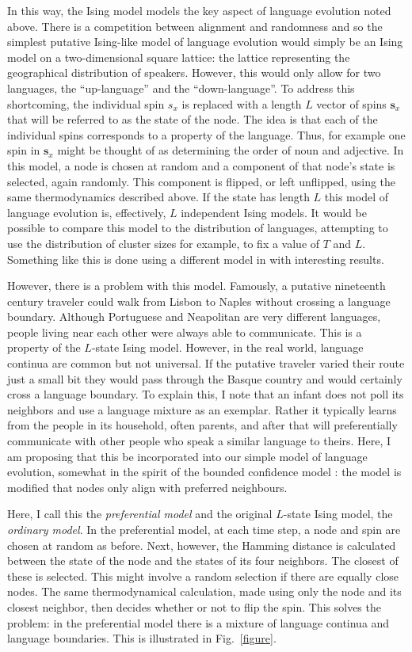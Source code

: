 \documentclass[letterpaper]{article}
\begin{document}
In this way, the Ising model models the key aspect of language evolution noted above. There is a competition between alignment and randomness and so the simplest putative Ising-like model of language evolution would simply be an Ising model on a two-dimensional square lattice: the lattice representing the geographical distribution of speakers. However, this would only allow for two languages, the ``up-language'' and the ``down-language''. To address this shortcoming, the individual spin $s_x$ is replaced with a length $L$ vector of spins $\textbf{s}_x$ that will be referred to as the state of the node. The idea is that each of the individual spins corresponds to a property of the language. Thus, for example one spin in $\textbf{s}_x$ might be thought of as determining the order of noun and adjective. In this model, a node is chosen at random and a component of that node's state is selected, again randomly. This component is flipped, or left unflipped, using the same thermodynamics described above. If the state has length $L$ this model of language evolution is, effectively, $L$ independent Ising models. It would be possible to compare this model to the distribution of languages, attempting to use the distribution of cluster sizes for example, to fix a value of $T$ and $L$. Something like this is done using a different model in \cite{SivaEtAl2015, SivaEtAl2017} with interesting results.

However, there is a problem with this model. Famously, a putative nineteenth century traveler could walk from Lisbon to Naples without crossing a language boundary. Although Portuguese and Neapolitan are very different languages, people living near each other were always able to communicate. This is a property of the $L$-state Ising model. However, in the real world, language continua are common but not universal. If the putative traveler varied their route just a small bit they would pass through the Basque country and would certainly cross a language boundary. To explain this, I note that an infant does not poll its neighbors and use a language mixture as an exemplar. Rather it typically learns from the people in its household, often parents, and after that will preferentially communicate with other people who speak a similar language to theirs. Here, I am proposing that this be incorporated into our simple model of language evolution, somewhat in the spirit of the bounded confidence model \citep{HegselmannKrause2019}: the model is modified that nodes only align with preferred neighbours.

Here, I call this the \textsl{preferential model} and the original $L$-state Ising model, the \textsl{ordinary model}. In the preferential model, at each time step, a node and spin are chosen at random as before. Next, however, the Hamming distance is calculated between the state of the node and the states of its four neighbors. The closest of these is selected. This might involve a random selection if there are equally close nodes. The same thermodynamical calculation, made using only the node and its closest neighbor, then decides whether or not to flip the spin. This solves the problem: in the preferential model there is a mixture of language continua and language boundaries. This is illustrated in Fig.~\ref{figure}. 
\end{document}
